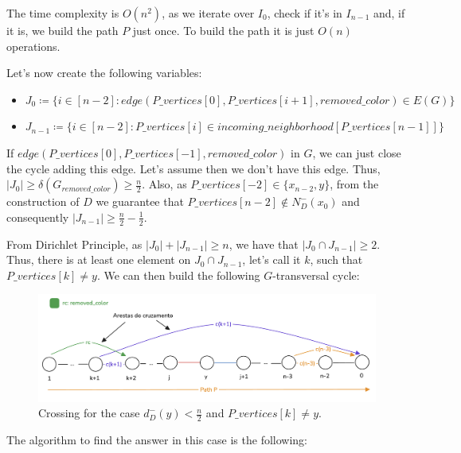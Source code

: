 The time complexity is $O(n^2)$, as we iterate over $I_0$, check if it's in $I_{n-1}$ and, if it is, we build the path $P$ just once.
To build the path it is just $O(n)$ operations.

Let's now create the following variables:

\begin{itemize}
    \item $J_0 \coloneqq \{i \in [n-2]: edge(P\_vertices[0], P\_vertices[i + 1], removed\_color) \in E(G)\}$
    \item $J_{n-1} \coloneqq \{i \in [n-2]: P\_vertices[i] \in incoming\_neighborhood[P\_vertices[n - 1]]\}$
\end{itemize}


If $edge(P\_vertices[0], P\_vertices[-1], removed\_color)$ in $G$, we can just 
close the cycle adding this edge. Let's assume then we don't have this edge. 
Thus, $|J_0| \geq \delta(G_{removed\_color}) \geq \frac{n}{2}$. Also, as $P\_vertices[-2] \in \{x_{n-2}, y\}$, 
from the construction of $D$ we guarantee that $P\_vertices[n-2] \notin N^-_D(x_0)$
and consequently $|J_{n-1}| \geq \frac{n}{2} - \frac{1}{2}$.

From Dirichlet Principle, as $|J_0| + |J_{n-1}| \geq n$, we have that $|J_0 \cap J_{n-1}| \geq 2$. Thus,
there is at least one element on $J_0 \cap J_{n-1}$, let's call it $k$, such that $P\_vertices[k] \neq y$.
We can then build the following $G$-transversal cycle:

\begin{figure}[H]
    \centering
    \includegraphics[width=1\textwidth]{figuras/cycle_n-1_cruzamento_not_y.png}
    \caption{Crossing for the case $d^-_D(y) < \frac{n}{2}$ and $P\_vertices[k] \neq y$.}
    \label{fig:cycle_n-1_cruzamento_not_y}
\end{figure}

The algorithm to find the answer in this case is the following:


